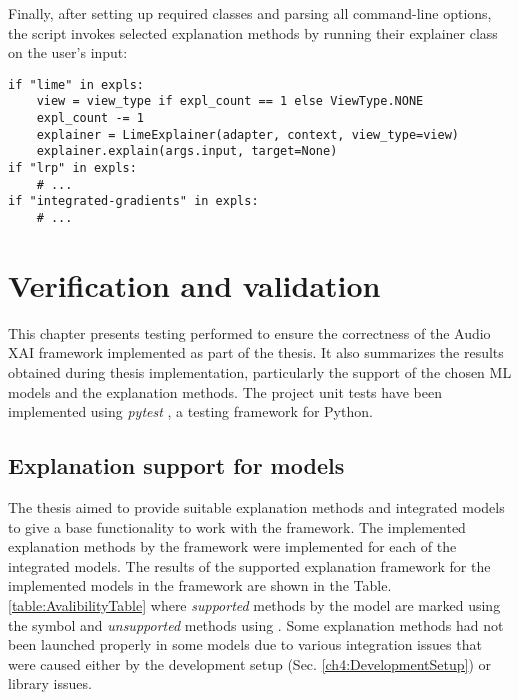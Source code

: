 \documentclass[
    bindingoffset=5mm,  %
    footnoteindent=3mm, %
    hyphenation=true    %
]{src/wut-thesis}
\newcommand{\cmark}{\ding{51}} %
\newcommand{\xmark}{\ding{55}} %
\begin{document}
Finally, after setting up required classes and parsing all command-line options,
the script invokes selected explanation methods by running their
explainer class on the user’s input:

\begin{verbatim}
if "lime" in expls:
    view = view_type if expl_count == 1 else ViewType.NONE
    expl_count -= 1
    explainer = LimeExplainer(adapter, context, view_type=view)
    explainer.explain(args.input, target=None)
if "lrp" in expls:
    # ...
if "integrated-gradients" in expls:
    # ...
\end{verbatim}

%
%
\clearpage %
\section{Verification and validation} \label{ch:verification}

This chapter presents testing performed to ensure the correctness of the Audio XAI framework
implemented as part of the thesis. It also summarizes the results obtained during thesis implementation,
particularly the support of the chosen ML models and the explanation methods.
The project unit tests have been implemented using \emph{pytest} \cite{PytestDoc}, a testing framework for Python.

\subsection{Explanation support for models} \label{ch6:ExplanationSupport}

The thesis aimed to provide suitable explanation methods and integrated models to give a base functionality
to work with the framework. The implemented explanation methods by the framework were implemented for
each of the integrated models. The results of the supported explanation framework for the implemented models
in the framework are shown in the Table. \ref{table:AvalibilityTable} where \emph{supported} methods by the model
are marked using the symbol \cmark and \emph{unsupported} methods using \xmark. Some explanation methods had not
been launched properly in some models due to various integration issues that were caused either by the development
setup (Sec. \ref{ch4:DevelopmentSetup}) or library issues.
\end{document}
